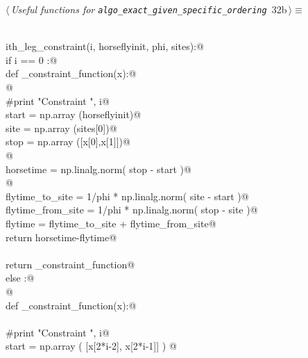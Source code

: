 \documentclass[11.5pt]{report}
\begin{document}
\begin{flushleft} \small\label{scrap43}\raggedright\small
{} $\langle\,${\itshape Useful functions for \verb|algo_exact_given_specific_ordering|}\nobreak\ {\footnotesize {32b}}$\,\rangle\equiv$
\vspace{-1ex}
\begin{list}{}{} \item
\mbox{}\verb@@\\
\mbox{}\verb@def ith_leg_constraint(i, horseflyinit, phi, sites):@\\
\mbox{}\verb@        if i == 0 :@\\
\mbox{}\verb@            def _constraint_function(x):@\\
\mbox{}\verb@            @\\
\mbox{}\verb@                #print "Constraint  ", i@\\
\mbox{}\verb@                start = np.array (horseflyinit)@\\
\mbox{}\verb@                site  = np.array (sites[0])@\\
\mbox{}\verb@                stop  = np.array ([x[0],x[1]])@\\
\mbox{}\verb@            @\\
\mbox{}\verb@                horsetime = np.linalg.norm( stop - start )@\\
\mbox{}\verb@            @\\
\mbox{}\verb@                flytime_to_site   = 1/phi * np.linalg.norm( site - start )@\\
\mbox{}\verb@                flytime_from_site = 1/phi * np.linalg.norm( stop - site  )@\\
\mbox{}\verb@                flytime           = flytime_to_site + flytime_from_site@\\
\mbox{}\verb@                return horsetime-flytime@\\
\mbox{}\verb@@\\
\mbox{}\verb@            return _constraint_function@\\
\mbox{}\verb@        else :@\\
\mbox{}\verb@          @\\
\mbox{}\verb@            def _constraint_function(x):@\\
\mbox{}\verb@@\\
\mbox{}\verb@               #print "Constraint  ", i@\\
\mbox{}\verb@               start = np.array (  [x[2*i-2], x[2*i-1]]  ) @\\

\end{list}
\end{flushleft}
\end{document}
